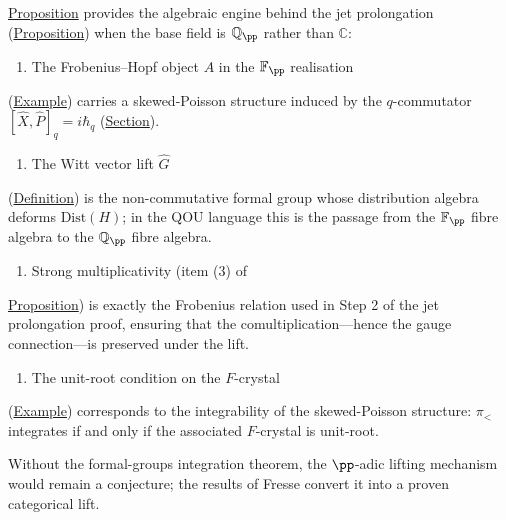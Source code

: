 \begin{remark}
  \label{rem:witt-lift-qou}
\hyperref[prop:skew-poisson-integration]{Proposition} provides the algebraic
engine behind the jet prolongation
(\hyperref[prop:jet-prolongation]{Proposition}) when the base field is
$\mathbb{Q}_\pp$ rather than $\mathbb{C}$:

\begin{enumerate}
  \item The Frobenius--Hopf object $A$ in the $\mathbb{F}_\pp$ realisation
\end{enumerate}
   (\hyperref[ex:finite-field-realisation]{Example}) carries a
   skewed-Poisson structure induced by the $q$-commutator
   $[\hat{X},\hat{P}]_q = i\hbar_q$
   (\hyperref[sec:enveloping-algebras]{Section}).

\begin{enumerate}
  \item The Witt vector lift $\widehat{G}$
\end{enumerate}
   (\hyperref[def:witt-vector-lift]{Definition}) is the non-commutative
   formal group whose distribution algebra deforms
   $\mathrm{Dist}(H)$; in the QOU language this is the passage from
   the $\mathbb{F}_\pp$ fibre algebra to the $\mathbb{Q}_\pp$ fibre
   algebra.

\begin{enumerate}
  \item Strong multiplicativity (item (3) of
\end{enumerate}
   \hyperref[prop:skew-poisson-integration]{Proposition}) is exactly the
   Frobenius relation used in Step 2 of the jet prolongation proof,
   ensuring that the comultiplication---hence the gauge connection---is
   preserved under the lift.

\begin{enumerate}
  \item The unit-root condition on the $F$-crystal
\end{enumerate}
   (\hyperref[ex:p-adic-realisation]{Example}) corresponds to the
   integrability of the skewed-Poisson structure: $\pi_<$ integrates
   if and only if the associated $F$-crystal is unit-root.

Without the formal-groups integration theorem, the $\pp$-adic lifting
mechanism would remain a conjecture; the results
of Fresse convert it into a proven categorical lift.
\end{remark}

